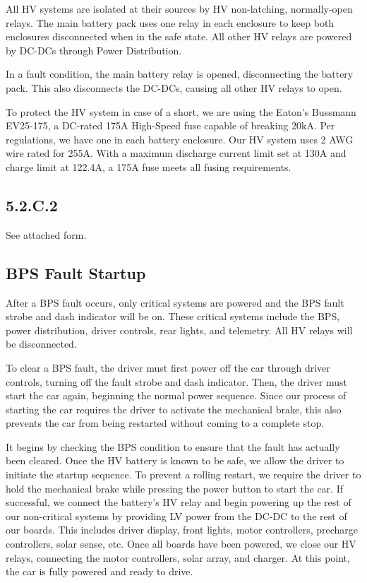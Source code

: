 \documentclass[10pt]{article}
\begin{document}
All HV systems are isolated at their sources by HV non-latching, normally-open relays. The main battery pack uses one relay in each enclosure to keep both enclosures disconnected when in the safe state. All other HV relays are powered by DC-DCs through Power Distribution.

In a fault condition, the main battery relay is opened, disconnecting the battery pack. This also disconnects the DC-DCs, causing all other HV relays to open.

To protect the HV system in case of a short, we are using the Eaton's Bussmann EV25-175, a DC-rated 175A High-Speed fuse capable of breaking 20kA. Per regulations, we have one in each battery enclosure. Our HV system uses 2 AWG wire rated for 255A. With a maximum discharge current limit set at 130A and charge limit at 122.4A, a 175A fuse meets all fusing requirements.





\subsection{5.2.C.2}

See attached form.



\subsection{BPS Fault Startup}

After a BPS fault occurs, only critical systems are powered and the BPS fault strobe and dash indicator will be on. These critical systems include the BPS, power distribution, driver controls, rear lights, and telemetry. All HV relays will be disconnected.

To clear a BPS fault, the driver must first power off the car through driver controls, turning off the fault strobe and dash indicator. Then, the driver must start the car again, beginning the normal power sequence. Since our process of starting the car requires the driver to activate the mechanical brake, this also prevents the car from being restarted without coming to a complete stop.

It begins by checking the BPS condition to ensure that the fault has actually been cleared. Once the HV battery is known to be safe, we allow the driver to initiate the startup sequence. To prevent a rolling restart, we require the driver to hold the mechanical brake while pressing the power button to start the car. If successful, we connect the battery's HV relay and begin powering up the rest of our non-critical systems by providing LV power from the DC-DC to the rest of our boards. This includes driver display, front lights, motor controllers, precharge controllers, solar sense, etc. Once all boards have been powered, we close our HV relays, connecting the motor controllers, solar array, and charger. At this point, the car is fully powered and ready to drive.


\pagebreak
\appendix
\end{document}
